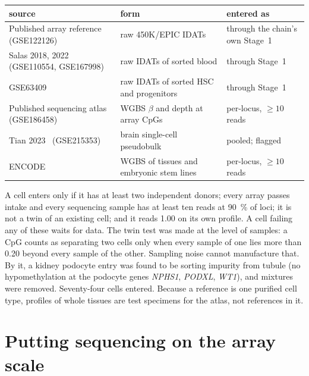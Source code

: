 \begin{center}\small
\begin{tabularx}{\linewidth}{@{}>{\raggedright\arraybackslash}X>{\raggedright\arraybackslash}X>{\raggedright\arraybackslash}X@{}}\toprule
source & form & entered as \\\midrule
Published array reference~\cite{Moss2018} (GSE122126) & raw 450K/EPIC IDATs & through the chain's own Stage~1 \\
Salas 2018, 2022~\cite{Salas2018,Salas2022} (GSE110554, GSE167998) & raw IDATs of sorted blood & through Stage~1 \\
GSE63409 & raw IDATs of sorted HSC and progenitors & through Stage~1 \\
Published sequencing atlas~\cite{Loyfer2023} (GSE186458) & WGBS $\beta$ and depth at array CpGs & per-locus, $\ge10$ reads \\
Tian 2023~\cite{Tian2023} (GSE215353) & brain single-cell pseudobulk & pooled; flagged \\
ENCODE & WGBS of tissues and embryonic stem lines & per-locus, $\ge10$ reads \\\bottomrule
\end{tabularx}
\end{center}
A cell enters only if it has at least two independent donors; every array passes intake and every sequencing sample has at least ten reads at
90~\% of loci; it is not a twin of an existing cell; and it reads 1.00 on its own profile. A cell failing any of these waits for data. The twin
test was made at the level of samples: a CpG counts as separating two cells only when every sample of one lies more than 0.20 beyond every sample of
the other. Sampling noise cannot manufacture that. By it, a kidney podocyte entry was found to be sorting impurity from tubule (no
hypomethylation at the podocyte genes \emph{NPHS1}, \emph{PODXL}, \emph{WT1}), and mixtures were removed. Seventy-four cells entered.
Because a reference is one purified cell type, profiles of whole tissues are test specimens for the atlas, not references in it.

\section{Putting sequencing on the array scale}

